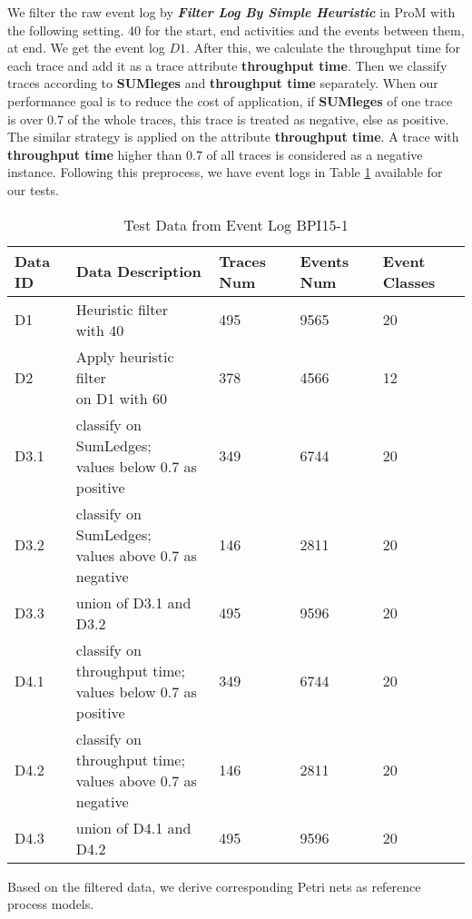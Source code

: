 We filter the raw event log by \textbf{\emph{Filter Log By Simple Heuristic}} in ProM with the following setting. 40 for the start, end  activities and the events between them, at end. We get the event log $D1$. After this, we calculate the throughput time for each trace and add it as a trace attribute \textbf{throughput time}. 
Then we classify traces according to  \textbf{SUMleges} and  \textbf{throughput time} separately. When our performance goal is to reduce the cost of application, if \textbf{SUMleges} of one trace is over 0.7 of the whole traces, this trace is treated as negative, else as positive. The similar strategy is applied on the attribute \textbf{throughput time}. A trace with \textbf{throughput time} higher than 0.7 of all traces is considered as a negative instance. Following this preprocess, we have event logs in Table \ref{tab:data-from-BPI1} available for our tests. 
\begin{table}
	\label{tab:data-from-BPI1}
	\caption{Test Data from Event Log BPI15-1}
	\begin{tabular}{|l|l|l|l|l|}
		\hline
		Data ID & Data Description                                & Traces Num & Events Num & Event Classes \\ \hline
		D1      & \makecell{Heuristic filter  \\ with 40 }                     & 495        & 9565       & 20             \\ \hline
		D2      & \makecell{Apply heuristic filter \\ on D1 with 60      }     & 378        & 4566       & 12            \\ \hline
		D3.1    & \makecell{classify on SumLedges;  \\ values below 0.7 as positive} & 349        & 6744       & 20             \\ \hline
		D3.2    & \makecell{classify on SumLedges;  \\ values above 0.7 as negative }& 146        & 2811       & 20             \\  \hline
		D3.3    & union of D3.1 and D3.2                             & 495        & 9596       & 20             \\ \hline
		D4.1    & \makecell{ classify on throughput time;  \\ values below 0.7 as positive} & 349        & 6744       & 20             \\ \hline
		D4.2    & \makecell{classify on throughput time;  \\ values above 0.7 as negative} & 146        & 2811       & 20            \\ \hline
		D4.3    & union of D4.1 and D4.2                             & 495        & 9596       & 20           \\ \hline
		
	\end{tabular}
\end{table}
Based on the filtered data, we derive corresponding Petri nets as reference process models. 


